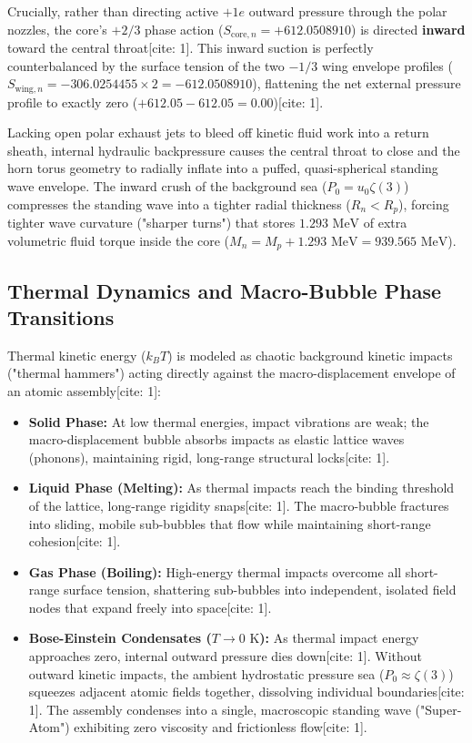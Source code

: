 \documentclass[11pt,a4paper]{article}
\begin{document}
	Crucially, rather than directing active $+1e$ outward pressure through the polar nozzles, the core's $+2/3$ phase action ($S_{\text{core}, n} = +612.0508910$) is directed \textbf{inward} toward the central throat[cite: 1]. This inward suction is perfectly counterbalanced by the surface tension of the two $-1/3$ wing envelope profiles ($S_{\text{wing}, n} = -306.0254455 \times 2 = -612.0508910$), flattening the net external pressure profile to exactly zero ($+612.05 - 612.05 = 0.00$)[cite: 1].
	
	Lacking open polar exhaust jets to bleed off kinetic fluid work into a return sheath, internal hydraulic backpressure causes the central throat to close and the horn torus geometry to radially inflate into a puffed, quasi-spherical standing wave envelope. The inward crush of the background sea ($P_0 = u_0 \zeta(3)$) compresses the standing wave into a tighter radial thickness ($R_n < R_p$), forcing tighter wave curvature ("sharper turns") that stores $1.293\text{ MeV}$ of extra volumetric fluid torque inside the core ($M_n = M_p + 1.293\text{ MeV} = 939.565\text{ MeV}$).
	
	\subsection{Thermal Dynamics and Macro-Bubble Phase Transitions}
	Thermal kinetic energy ($k_B T$) is modeled as chaotic background kinetic impacts ("thermal hammers") acting directly against the macro-displacement envelope of an atomic assembly[cite: 1]:
	\begin{itemize}
		\item \textbf{Solid Phase:} At low thermal energies, impact vibrations are weak; the macro-displacement bubble absorbs impacts as elastic lattice waves (phonons), maintaining rigid, long-range structural locks[cite: 1].
		\item \textbf{Liquid Phase (Melting):} As thermal impacts reach the binding threshold of the lattice, long-range rigidity snaps[cite: 1]. The macro-bubble fractures into sliding, mobile sub-bubbles that flow while maintaining short-range cohesion[cite: 1].
		\item \textbf{Gas Phase (Boiling):} High-energy thermal impacts overcome all short-range surface tension, shattering sub-bubbles into independent, isolated field nodes that expand freely into space[cite: 1].
		\item \textbf{Bose-Einstein Condensates ($T \to 0\text{ K}$):} As thermal impact energy approaches zero, internal outward pressure dies down[cite: 1]. Without outward kinetic impacts, the ambient hydrostatic pressure sea ($P_0 \approx \zeta(3)$) squeezes adjacent atomic fields together, dissolving individual boundaries[cite: 1]. The assembly condenses into a single, macroscopic standing wave ("Super-Atom") exhibiting zero viscosity and frictionless flow[cite: 1].
	\end{itemize}
	
\end{document}
